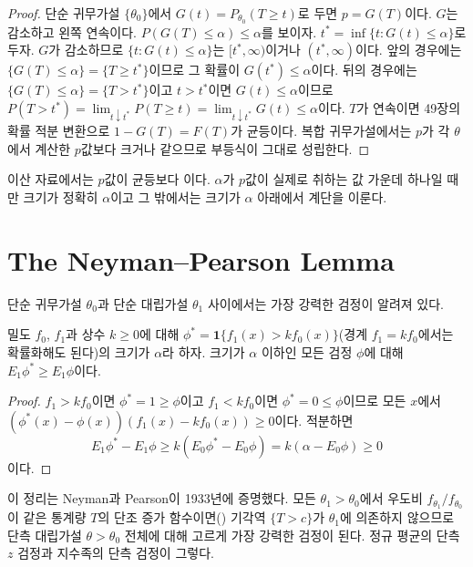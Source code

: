 \begin{proof}
단순 귀무가설 $\{\theta_0\}$에서 $G(t)=P_{\theta_0}(T\ge t)$로 두면 $p=G(T)$이다. $G$는 감소하고 왼쪽 연속이다. $P(G(T)\le\alpha)\le\alpha$를 보이자. $t^\ast=\inf\{t:G(t)\le\alpha\}$로 두자. $G$가 감소하므로 $\{t:G(t)\le\alpha\}$는 $[t^\ast,\infty)$이거나 $(t^\ast,\infty)$이다. 앞의 경우에는 $\{G(T)\le\alpha\}=\{T\ge t^\ast\}$이므로 그 확률이 $G(t^\ast)\le\alpha$이다. 뒤의 경우에는 $\{G(T)\le\alpha\}=\{T>t^\ast\}$이고 $t>t^\ast$이면 $G(t)\le\alpha$이므로 $P(T>t^\ast)=\lim_{t\downarrow t^\ast}P(T\ge t)=\lim_{t\downarrow t^\ast}G(t)\le\alpha$이다. $T$가 연속이면 49장의 확률 적분 변환으로 $1-G(T)=F(T)$가 균등이다. 복합 귀무가설에서는 $p$가 각 $\theta$에서 계산한 $p$값보다 크거나 같으므로 부등식이 그대로 성립한다.
\end{proof}

이산 자료에서는 $p$값이 균등보다 이다. $\alpha$가 $p$값이 실제로 취하는 값 가운데 하나일 때만 크기가 정확히 $\alpha$이고 그 밖에서는 크기가 $\alpha$ 아래에서 계단을 이룬다.

\section{The Neyman--Pearson Lemma}
\label{sec:neyman-pearson}

단순 귀무가설 $\theta_0$과 단순 대립가설 $\theta_1$ 사이에서는 가장 강력한 검정이 알려져 있다.

\begin{theorem}
\label{thm:neyman-pearson}
밀도 $f_0$, $f_1$과 상수 $k\ge0$에 대해 $\phi^\ast=\mathbf 1\{f_1(x)>kf_0(x)\}$(경계 $f_1=kf_0$에서는 확률화해도 된다)의 크기가 $\alpha$라 하자. 크기가 $\alpha$ 이하인 모든 검정 $\phi$에 대해 $E_1\phi^\ast\ge E_1\phi$이다.
\end{theorem}

\begin{proof}
$f_1>kf_0$이면 $\phi^\ast=1\ge\phi$이고 $f_1<kf_0$이면 $\phi^\ast=0\le\phi$이므로 모든 $x$에서 $(\phi^\ast(x)-\phi(x))(f_1(x)-kf_0(x))\ge0$이다. 적분하면
\[
E_1\phi^\ast-E_1\phi\ge k(E_0\phi^\ast-E_0\phi)=k(\alpha-E_0\phi)\ge0
\]
이다.
\end{proof}

이 정리는 Neyman과 Pearson이 1933년에 증명했다\cite{neyman1933}. 모든 $\theta_1>\theta_0$에서 우도비 $f_{\theta_1}/f_{\theta_0}$이 같은 통계량 $T$의 단조 증가 함수이면() 기각역 $\{T>c\}$가 $\theta_1$에 의존하지 않으므로 단측 대립가설 $\theta>\theta_0$ 전체에 대해 고르게 가장 강력한 검정이 된다. 정규 평균의 단측 $z$ 검정과 지수족의 단측 검정이 그렇다.

